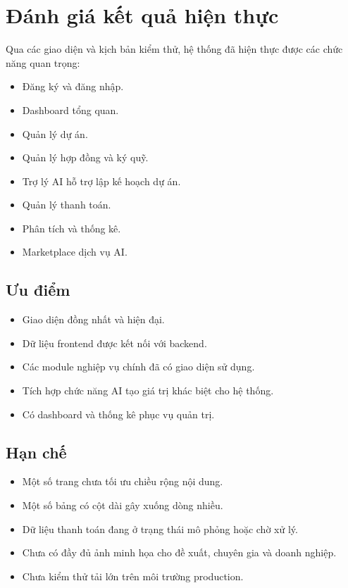 \section{Đánh giá kết quả hiện thực}
\label{sec:implementation-evaluation}

Qua các giao diện và kịch bản kiểm thử, hệ thống đã hiện thực được các chức năng quan trọng:

\begin{itemize}
    \item Đăng ký và đăng nhập.
    \item Dashboard tổng quan.
    \item Quản lý dự án.
    \item Quản lý hợp đồng và ký quỹ.
    \item Trợ lý AI hỗ trợ lập kế hoạch dự án.
    \item Quản lý thanh toán.
    \item Phân tích và thống kê.
    \item Marketplace dịch vụ AI.
\end{itemize}

\subsection{Ưu điểm}

\begin{itemize}
    \item Giao diện đồng nhất và hiện đại.
    \item Dữ liệu frontend được kết nối với backend.
    \item Các module nghiệp vụ chính đã có giao diện sử dụng.
    \item Tích hợp chức năng AI tạo giá trị khác biệt cho hệ thống.
    \item Có dashboard và thống kê phục vụ quản trị.
\end{itemize}

\subsection{Hạn chế}

\begin{itemize}
    \item Một số trang chưa tối ưu chiều rộng nội dung.
    \item Một số bảng có cột dài gây xuống dòng nhiều.
    \item Dữ liệu thanh toán đang ở trạng thái mô phỏng hoặc chờ xử lý.
    \item Chưa có đầy đủ ảnh minh họa cho đề xuất, chuyên gia và doanh nghiệp.
    \item Chưa kiểm thử tải lớn trên môi trường production.
\end{itemize}

